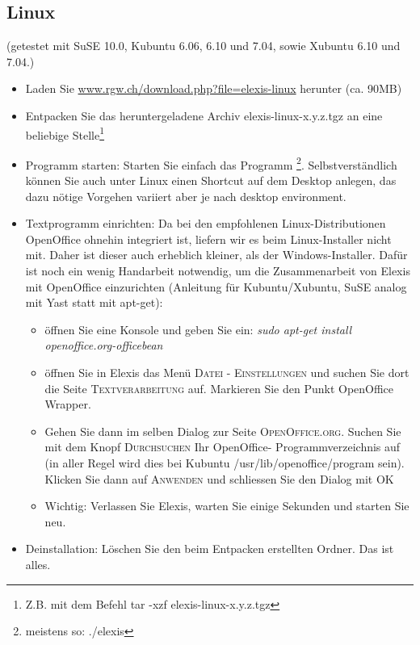 \subsection{Linux}
(getestet mit SuSE 10.0, Kubuntu 6.06, 6.10 und 7.04, sowie  Xubuntu 6.10 und
7.04.)
\begin{itemize}
	\item Laden Sie \href{http://www.rgw.ch/download.php?file=elexis-linux}{www.rgw.ch/download.php?file=elexis-linux} herunter (ca. 90MB)
	\item Entpacken Sie das	heruntergeladene Archiv	elexis-linux-x.y.z.tgz an eine beliebige Stelle\footnote{Z.B. mit dem Befehl tar -xzf elexis-linux-x.y.z.tgz}
    \item Programm starten: Starten Sie einfach das Programm \footnote{meistens so: ./elexis}. Selbstverständlich können Sie auch unter Linux einen Shortcut auf dem Desktop
    anlegen, das dazu nötige Vorgehen variiert aber je nach desktop environment.

 	\item Textprogramm einrichten: Da bei den empfohlenen Linux-Distributionen
 	OpenOffice ohnehin integriert ist, liefern wir es beim Linux-Installer nicht
 	mit. Daher ist dieser auch erheblich kleiner, als der Windows-Installer. Dafür
 	ist noch ein wenig 	\glqq Handarbeit\grqq{} notwendig, um die Zusammenarbeit
 	von Elexis mit OpenOffice einzurichten (Anleitung für Kubuntu/Xubuntu, SuSE
 	analog mit Yast statt mit apt-get):
	\begin{itemize}
	 	\item öffnen Sie eine Konsole und geben Sie ein: \textit{sudo apt-get in\-stall
	 	openoffice.org-office\-bean}
		\item öffnen Sie in Elexis das Menü \textsc{Datei - Einstellungen} und suchen
		Sie dort die Seite \textsc{Textverarbeitung} auf. Markieren Sie den Punkt
		\glqq Open\-Of\-fice Wrap\-per\grqq{}.
		\item Gehen Sie dann im selben Dialog zur Seite \textsc{OpenOffice.org}.
		Suchen Sie mit dem Knopf \textsc{Durchsuchen} Ihr OpenOffice-
		Programmverzeichnis auf (in aller Regel wird dies bei Kubuntu
		/usr/lib/openoffice/program sein). Klicken Sie dann auf \textsc{Anwenden} und
		schliessen Sie den Dialog mit \textsc{OK}
		\item Wichtig: Verlassen Sie Elexis, warten Sie einige Sekunden und starten
		Sie neu.
    \end{itemize}
  \item Deinstallation: Löschen Sie den beim Entpacken erstellten Ordner. Das
 ist alles.
\end{itemize}

